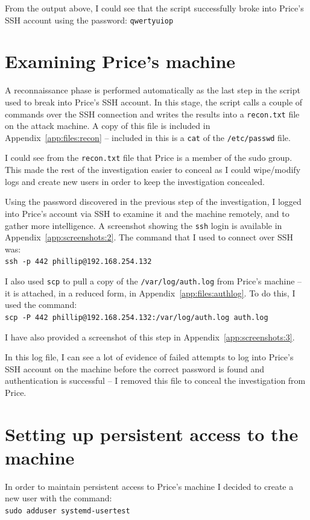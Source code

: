 \documentclass[12pt]{report}
\newcommand{\term}[1]{\colorbox{light-gray}{\texttt{#1}}}
\begin{document}
From the output above, I could see that the script successfully broke into Price's SSH account using the password: \texttt{qwertyuiop}


\section{Examining Price's machine}
A reconnaissance phase is performed automatically as the last step in the script used to break into Price's SSH account. In this stage, the script calls a couple of commands over the SSH connection and writes the results into a \texttt{recon.txt} file on the attack machine. A copy of this file is included in Appendix~\ref{app:files:recon} -- included in this is a \term{cat} of the \texttt{/etc/passwd} file.

I could see from the \texttt{recon.txt} file that Price is a member of the sudo group. This made the rest of the investigation easier to conceal as I could wipe/modify logs and create new users in order to keep the investigation concealed.

Using the password discovered in the previous step of the investigation, I logged into Price's account via SSH to examine it and the machine remotely, and to gather more intelligence. A screenshot showing the \texttt{ssh} login is available in Appendix~\ref{app:screenshots:2}. The command that I used to connect over SSH was:\\
\term{ssh -p 442 phillip@192.168.254.132}

I also used \texttt{scp} to pull a copy of the \texttt{/var/log/auth.log} from Price's machine -- it is attached, in a reduced form, in Appendix~\ref{app:files:authlog}. To do this, I used the command:\\
\term{scp -P 442 phillip@192.168.254.132:/var/log/auth.log auth.log}

I have also provided a screenshot of this step in Appendix~\ref{app:screenshots:3}.

In this log file, I can see a lot of evidence of failed attempts to log into Price's SSH account on the machine before the correct password is found and authentication is successful -- I removed this file to conceal the investigation from Price.


\section{Setting up persistent access to the machine}
In order to maintain persistent access to Price's machine I decided to create a new user with the command:\\
\term{sudo adduser systemd-usertest}
\end{document}
